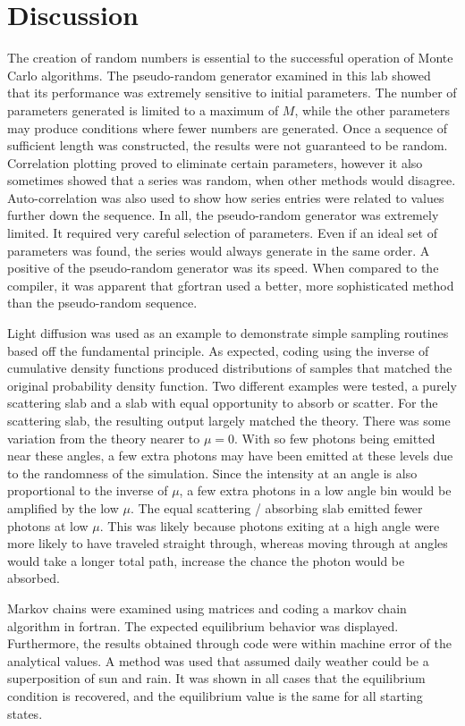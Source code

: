 \documentclass[twocolumn]{article}
\begin{document}
\section{Discussion}
The creation of random numbers is essential to the successful operation of Monte Carlo algorithms. The pseudo-random generator examined in this lab showed that its performance was extremely sensitive to initial parameters. The number of parameters generated is limited to a maximum of $M$, while the other parameters may produce conditions where fewer numbers are generated. Once a sequence of sufficient length was constructed, the results were not guaranteed to be random. Correlation plotting proved to eliminate certain parameters, however it also sometimes showed that a series was random, when other methods would disagree. Auto-correlation was also used to show how series entries were related to values further down the sequence. In all, the pseudo-random generator was extremely limited. It required very careful selection of parameters. Even if an ideal set of parameters was found, the series would always generate in the same order. A positive of the pseudo-random generator was its speed. When compared to the compiler, it was apparent that gfortran used a better, more sophisticated method than the pseudo-random sequence. 

Light diffusion was used as an example to demonstrate simple sampling routines based off the fundamental principle. As expected, coding using the inverse of cumulative density functions produced distributions of samples that matched the original probability density function. Two different examples were tested, a purely scattering slab and a slab with equal opportunity to absorb or scatter. For the scattering slab, the resulting output largely matched the theory. There was some variation from the theory nearer to $\mu=0$. With so few photons being emitted near these angles, a few extra photons may have been emitted at these levels due to the randomness of the simulation. Since the intensity at an angle is also proportional to the inverse of $\mu$, a few extra photons in a low angle bin would be amplified by the low $\mu$. The equal scattering / absorbing slab emitted fewer photons at low $\mu$. This was likely because photons exiting at a high angle were more likely to have traveled straight through, whereas moving through at angles would take a longer total path, increase the chance the photon would be absorbed.

Markov chains were examined using matrices and coding a markov chain algorithm in fortran. The expected equilibrium behavior was displayed. Furthermore, the results obtained through code were within machine error of the analytical values. A method was used that assumed daily weather could be a superposition of sun and rain. It was shown in all cases that the equilibrium condition is recovered, and the equilibrium value is the same for all starting states.
\end{document}
